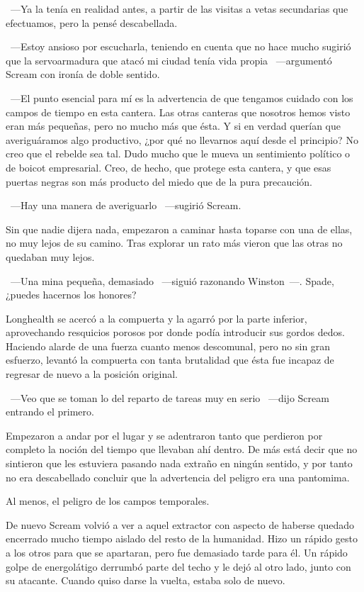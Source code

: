 ~---Ya la tenía en realidad antes, a partir de las visitas a vetas secundarias que efectuamos, pero la pensé descabellada.

~---Estoy ansioso por escucharla, teniendo en cuenta que no hace mucho sugirió que la servoarmadura que atacó mi ciudad tenía vida propia ~---argumentó Scream con ironía de doble sentido.

~---El punto esencial para mí es la advertencia de que tengamos cuidado con los campos de tiempo en esta cantera. Las otras canteras que nosotros hemos visto eran más pequeñas, pero no mucho más que ésta. Y si en verdad querían que averiguáramos algo productivo, ¿por qué no llevarnos aquí desde el principio? No creo que el rebelde sea tal. Dudo mucho que le mueva un sentimiento político o de boicot empresarial. Creo, de hecho, que protege esta cantera, y que esas puertas negras son más producto del miedo que de la pura precaución.

~---Hay una manera de averiguarlo ~---sugirió Scream.

Sin que nadie dijera nada, empezaron a caminar hasta toparse con una de ellas, no muy lejos de su camino. Tras explorar un rato más vieron que las otras no quedaban muy lejos.

~---Una mina pequeña, demasiado ~---siguió razonando Winston~---. Spade, ¿puedes hacernos los honores?

Longhealth se acercó a la compuerta y la agarró por la parte inferior, aprovechando resquicios porosos por donde podía introducir sus gordos dedos. Haciendo alarde de una fuerza cuanto menos descomunal, pero no sin gran esfuerzo, levantó la compuerta con tanta brutalidad que ésta fue incapaz de regresar de nuevo a la posición original.

~---Veo que se toman lo del reparto de tareas muy en serio ~---dijo Scream entrando el primero.

Empezaron a andar por el lugar y se adentraron tanto que perdieron por completo la noción del tiempo que llevaban ahí dentro. De más está decir que no sintieron que les estuviera pasando nada extraño en ningún sentido, y por tanto no era descabellado concluir que la advertencia del peligro era una pantomima.

Al menos, el peligro de los campos temporales.

De nuevo Scream volvió a ver a aquel extractor con aspecto de haberse quedado encerrado mucho tiempo aislado del resto de la humanidad. Hizo un rápido gesto a los otros para que se apartaran, pero fue demasiado tarde para él. Un rápido golpe de energolátigo derrumbó parte del techo y le dejó al otro lado, junto con su atacante. Cuando quiso darse la vuelta, estaba solo de nuevo.

